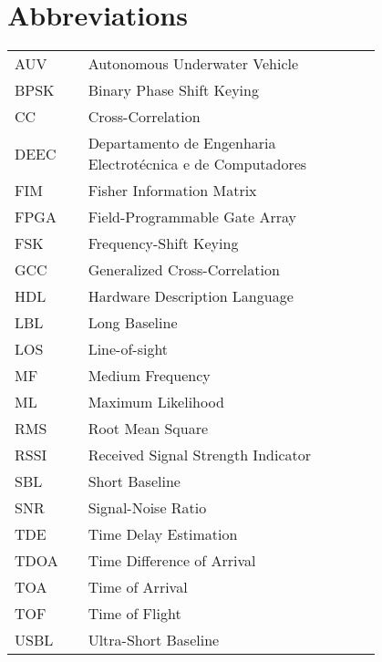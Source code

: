 \chapter*{Abbreviations}

\begin{flushleft}
\begin{tabular}{l p{0.8\linewidth}}
AUV		& Autonomous Underwater Vehicle \\
BPSK    & Binary Phase Shift Keying \\
CC 		  & Cross-Correlation \\
DEEC	& Departamento de Engenharia Electrotécnica e de Computadores \\
FIM		  & Fisher Information Matrix \\
FPGA    & Field-Programmable Gate Array \\
FSK		  & Frequency-Shift Keying \\
GCC      & Generalized Cross-Correlation \\
HDL		 & Hardware Description Language\\
LBL		  & Long Baseline\\
LOS		 & Line-of-sight\\
MF		  & Medium Frequency \\
ML		  & Maximum Likelihood \\
RMS		 & Root Mean Square \\
RSSI 	  & Received Signal Strength Indicator \\
SBL		  & Short Baseline \\
SNR		 & Signal-Noise Ratio\\
TDE 	 & Time Delay Estimation \\
TDOA   & Time Difference of Arrival \\
TOA	   	& Time of Arrival \\
TOF		 & Time of Flight \\
USBL    & Ultra-Short Baseline
\end{tabular}
\end{flushleft}
